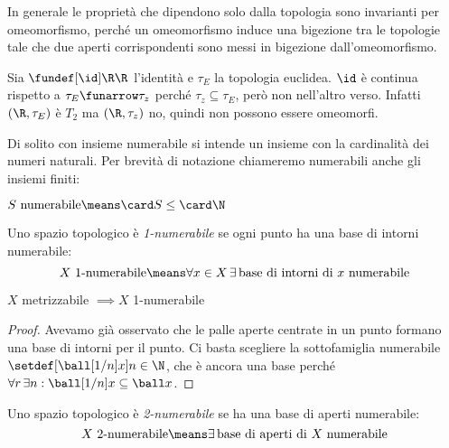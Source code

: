 \begin{oss}
	In generale le proprietà che dipendono solo dalla topologia sono invarianti per omeomorfismo, perché un omeomorfismo induce una bigezione tra le topologie tale che due aperti corrispondenti sono messi in bigezione dall'omeomorfismo.
\end{oss}

\begin{es}
	Sia $\fundef[\id]\R\R$ l'identità e $\tau_E$ la topologia euclidea.
	$\id$ è continua rispetto a $\tau_E\funarrow\tau_z$ perché $\tau_z\subseteq\tau_E$,
	però non nell'altro verso.
	Infatti $(\R,\tau_E)$ è $T_2$ ma $(\R,\tau_z)$ no,
	quindi non possono essere omeomorfi.
\end{es}


Di solito con insieme numerabile si intende un insieme con la cardinalità dei numeri naturali. Per brevità di notazione chiameremo numerabili anche gli insiemi finiti:

\begin{defn}[Numerabilità]
	$S\text{ numerabile}\means\card S\leq\card\N$
\end{defn}

\begin{defn}
	Uno spazio topologico è \emph{1-numerabile} se ogni punto ha una base di intorni numerabile:
	\[X\text{ 1-numerabile}\means
	\forall x\in X\,\exists\,\text{base di intorni di $x$ numerabile}\]
\end{defn}

\begin{prop}
	$X$ metrizzabile $\implies X$ 1-numerabile
\end{prop}

\begin{proof}
	Avevamo già osservato che le palle aperte centrate in un punto formano una base di intorni per il punto.
	Ci basta scegliere la sottofamiglia numerabile $\setdef[{\ball[1/n]x}]{n\in\N}$,
	che è ancora una base perché $\forall r\,\exists n:\ball[1/n]x\subseteq\ball x$.
\end{proof}

\begin{defn}
	Uno spazio topologico è \emph{2-numerabile} se ha una base di aperti numerabile:
	\[X\text{ 2-numerabile}\means\exists\,\text{base di aperti di $X$ numerabile}\]
\end{defn}
